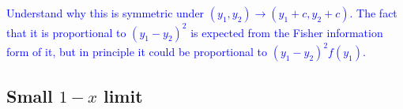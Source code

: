 \documentclass[11pt]{article}
\newcommand{\lb}{\left(}
\newcommand{\rb}{\right)}
\newcommand{\NL}[1]{\textcolor{blue}{#1}}
\begin{document}
\NL{Understand why this is symmetric under $(y_1,y_2)\to (y_1+c,y_2+c)$. The fact that it is proportional to $(y_1-y_2)^2$ is expected from the Fisher information form of it, but in principle it could be proportional to $(y_1-y_2)^2 f(y_1)$.}





\subsection{\texorpdfstring{Small $1-x$ limit}{Small 1-x limit}}
\end{document}
